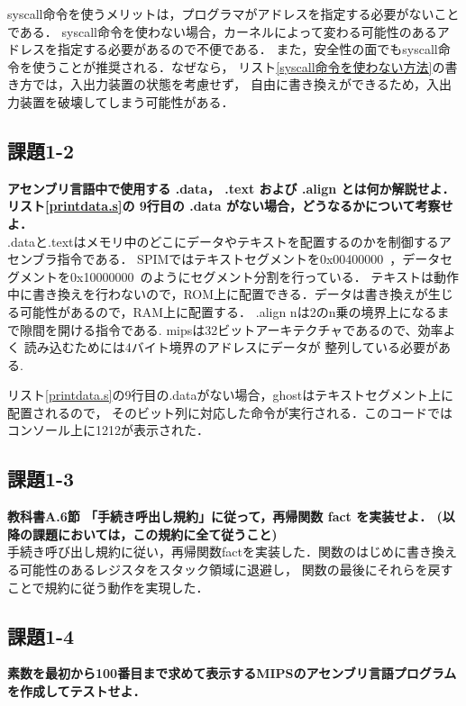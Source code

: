 \documentclass[11pt]{jarticle}
\begin{document}
syscall命令を使うメリットは，プログラマがアドレスを指定する必要がないことである．
syscall命令を使わない場合，カーネルによって変わる可能性のあるアドレスを指定する必要があるので不便である．
また，安全性の面でもsyscall命令を使うことが推奨される．なぜなら，
リスト\ref{syscall命令を使わない方法}の書き方では，入出力装置の状態を考慮せず，
自由に書き換えができるため，入出力装置を破壊してしまう可能性がある．

\subsection{課題1-2}

\textbf{アセンブリ言語中で使用する .data， .text および .align とは何か解説せよ． リスト\ref{printdata.s}の 9行目の .data がない場合，どうなるかについて考察せよ．}\\

.dataと.textはメモリ中のどこにデータやテキストを配置するのかを制御するアセンブラ指令である．
SPIMではテキストセグメントを0x00400000~，データセグメントを0x10000000~のようにセグメント分割を行っている．
テキストは動作中に書き換えを行わないので，ROM上に配置できる．データは書き換えが生じる可能性があるので，RAM上に配置する．
.align nは2のn乗の境界上になるまで隙間を開ける指令である.
mipsは32ビットアーキテクチャであるので、効率よく
読み込むためには4バイト境界のアドレスにデータが
整列している必要がある.

リスト\ref{printdata.s}の9行目の.dataがない場合，ghostはテキストセグメント上に配置されるので，
そのビット列に対応した命令が実行される．このコードではコンソール上に1212が表示された．

\subsection{課題1-3}

\textbf{教科書A.6節 「手続き呼出し規約」に従って，再帰関数 fact を実装せよ． (以降の課題においては，この規約に全て従うこと)}\\

手続き呼び出し規約に従い，再帰関数factを実装した．関数のはじめに書き換える可能性のあるレジスタをスタック領域に退避し，
関数の最後にそれらを戻すことで規約に従う動作を実現した．

\subsection{課題1-4}

\textbf{素数を最初から100番目まで求めて表示するMIPSのアセンブリ言語プログラムを作成してテストせよ．}\\
\end{document}
